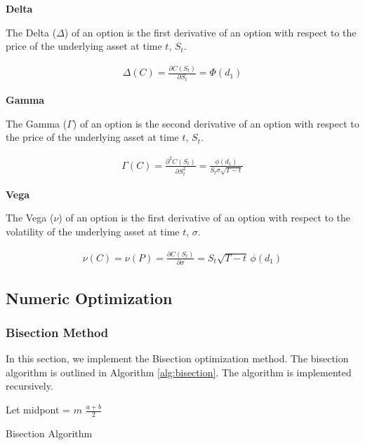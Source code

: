 \documentclass[10pt]{article}
\begin{document}
        \textbf{Delta}
    
        The Delta ($\Delta$) of an option is the first derivative of an option with respect to the price of the underlying asset at time $t$, $S_t$.
    
        \begin{gather*}
            \Delta(C) = \frac{\partial C(S_t)}{\partial S_t} = \Phi(d_1)
        \end{gather*}
    
        \textbf{Gamma}
    
        The Gamma ($\Gamma$) of an option is the second derivative of an option with respect to the price of the underlying asset at time $t$, $S_t$.
    
        \begin{gather*}
            \Gamma(C) = \frac{\partial^2 C(S_t)}{\partial S_t^2} = \frac{\phi(d_1)}{S_t \sigma \sqrt{T-t}}
        \end{gather*}
    
        \textbf{Vega}
    
        The Vega ($\nu$) of an option is the first derivative of an option with respect to the volatility of the underlying asset at time $t$, $\sigma$.
        
        \begin{gather*}
            \nu(C) = \nu(P) = \frac{\partial C(S_t)}{\partial \sigma} = S_t \sqrt{T-t} \, \phi(d_1)
        \end{gather*}
        
        

    \newpage
    \subsection{Numeric Optimization}

        \subsubsection{Bisection Method}

        In this section, we implement the Bisection optimization method. The bisection algorithm is outlined in Algorithm \ref{alg:bisection}. The algorithm is implemented recursively.

        \begin{algorithm}[h]
            \SetAlgoNoLine
            Let midpont = $m$\;
            \Return $\frac{a + b}{2}$\;
            \caption{Bisection Algorithm}
            \label{alg:bisection}
        \end{algorithm}
\end{document}
